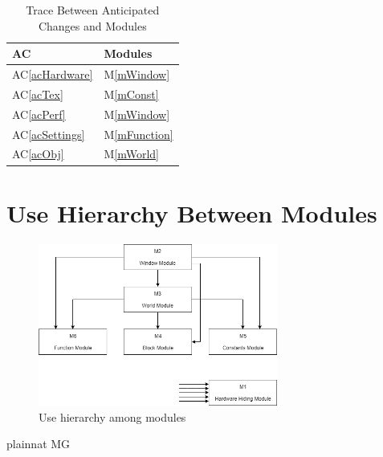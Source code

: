 \documentclass[12pt, titlepage]{article}
\newcommand{\acref}[1]{AC\ref{#1}}
\newcommand{\mref}[1]{M\ref{#1}}
\begin{document}
\begin{table}[H]
\centering
\begin{tabular}{p{} p{}}
\toprule
\textbf{AC} & \textbf{Modules}\\
\midrule
\acref{acHardware} & \mref{mWindow}\\
\acref{acTex} & \mref{mConst}\\
\acref{acPerf} & \mref{mWindow}\\
\acref{acSettings} & \mref{mFunction}\\
\acref{acObj} & \mref{mWorld}\\
\bottomrule
\end{tabular}
\caption{Trace Between Anticipated Changes and Modules}
\label{TblACT}
\end{table}

\section{Use Hierarchy Between Modules} \label{SecUse}

\begin{figure}[H]
\centering
\includegraphics[width=0.7\textwidth]{3XA3ModuleHi.png}
\caption{Use hierarchy among modules}
\label{FigUH}
\end{figure}


 {plainnat}
 {MG}
\end{document}
